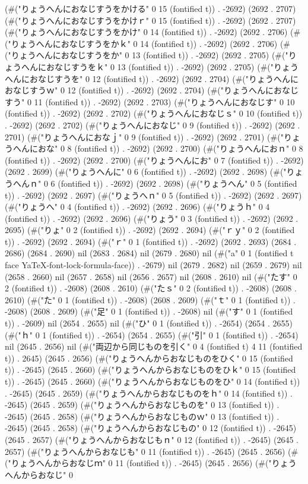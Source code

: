 (#("りょうへんにおなじすうをかける" 0 15 (fontified t)) . -2692) (2692 . 2707) (#("りょうへんにおなじすうをかけｒ" 0 15 (fontified t)) . -2692) (2692 . 2707) (#("りょうへんにおなじすうをかけ" 0 14 (fontified t)) . -2692) (2692 . 2706) (#("りょうへんにおなじすうをかｋ" 0 14 (fontified t)) . -2692) (2692 . 2706) (#("りょうへんにおなじすうをか" 0 13 (fontified t)) . -2692) (2692 . 2705) (#("りょうへんにおなじすうをｋ" 0 13 (fontified t)) . -2692) (2692 . 2705) (#("りょうへんにおなじすうを" 0 12 (fontified t)) . -2692) (2692 . 2704) (#("りょうへんにおなじすうｗ" 0 12 (fontified t)) . -2692) (2692 . 2704) (#("りょうへんにおなじすう" 0 11 (fontified t)) . -2692) (2692 . 2703) (#("りょうへんにおなじす" 0 10 (fontified t)) . -2692) (2692 . 2702) (#("りょうへんにおなじｓ" 0 10 (fontified t)) . -2692) (2692 . 2702) (#("りょうへんにおなじ" 0 9 (fontified t)) . -2692) (2692 . 2701) (#("りょうへんにおなｊ" 0 9 (fontified t)) . -2692) (2692 . 2701) (#("りょうへんにおな" 0 8 (fontified t)) . -2692) (2692 . 2700) (#("りょうへんにおｎ" 0 8 (fontified t)) . -2692) (2692 . 2700) (#("りょうへんにお" 0 7 (fontified t)) . -2692) (2692 . 2699) (#("りょうへんに" 0 6 (fontified t)) . -2692) (2692 . 2698) (#("りょうへんｎ" 0 6 (fontified t)) . -2692) (2692 . 2698) (#("りょうへん" 0 5 (fontified t)) . -2692) (2692 . 2697) (#("りょうへｎ" 0 5 (fontified t)) . -2692) (2692 . 2697) (#("りょうへ" 0 4 (fontified t)) . -2692) (2692 . 2696) (#("りょうｈ" 0 4 (fontified t)) . -2692) (2692 . 2696) (#("りょう" 0 3 (fontified t)) . -2692) (2692 . 2695) (#("りょ" 0 2 (fontified t)) . -2692) (2692 . 2694) (#("ｒｙ" 0 2 (fontified t)) . -2692) (2692 . 2694) (#("ｒ" 0 1 (fontified t)) . -2692) (2692 . 2693) (2684 . 2686) (2684 . 2690) nil (2683 . 2684) nil (2679 . 2680) nil (#("a" 0 1 (fontified t face YaTeX-font-lock-formula-face)) . -2679) nil (2679 . 2682) nil (2659 . 2679) nil (2658 . 2660) nil (2657 . 2658) nil (2656 . 2657) nil (2608 . 2610) nil (#("たす" 0 2 (fontified t)) . -2608) (2608 . 2610) (#("たｓ" 0 2 (fontified t)) . -2608) (2608 . 2610) (#("た" 0 1 (fontified t)) . -2608) (2608 . 2609) (#("ｔ" 0 1 (fontified t)) . -2608) (2608 . 2609) (#("足" 0 1 (fontified t)) . -2608) nil (#("す" 0 1 (fontified t)) . -2609) nil (2654 . 2655) nil (#("ひ" 0 1 (fontified t)) . -2654) (2654 . 2655) (#("ｈ" 0 1 (fontified t)) . -2654) (2654 . 2655) (#("引" 0 1 (fontified t)) . -2654) nil (2645 . 2656) nil (#("両辺から同じものを引く" 0 4 (fontified t) 4 11 (fontified t)) . 2645) (2645 . 2656) (#("りょうへんからおなじものをひく" 0 15 (fontified t)) . -2645) (2645 . 2660) (#("りょうへんからおなじものをひｋ" 0 15 (fontified t)) . -2645) (2645 . 2660) (#("りょうへんからおなじものをひ" 0 14 (fontified t)) . -2645) (2645 . 2659) (#("りょうへんからおなじものをｈ" 0 14 (fontified t)) . -2645) (2645 . 2659) (#("りょうへんからおなじものを" 0 13 (fontified t)) . -2645) (2645 . 2658) (#("りょうへんからおなじものｗ" 0 13 (fontified t)) . -2645) (2645 . 2658) (#("りょうへんからおなじもの" 0 12 (fontified t)) . -2645) (2645 . 2657) (#("りょうへんからおなじもｎ" 0 12 (fontified t)) . -2645) (2645 . 2657) (#("りょうへんからおなじも" 0 11 (fontified t)) . -2645) (2645 . 2656) (#("りょうへんからおなじｍ" 0 11 (fontified t)) . -2645) (2645 . 2656) (#("りょうへんからおなじ" 0 